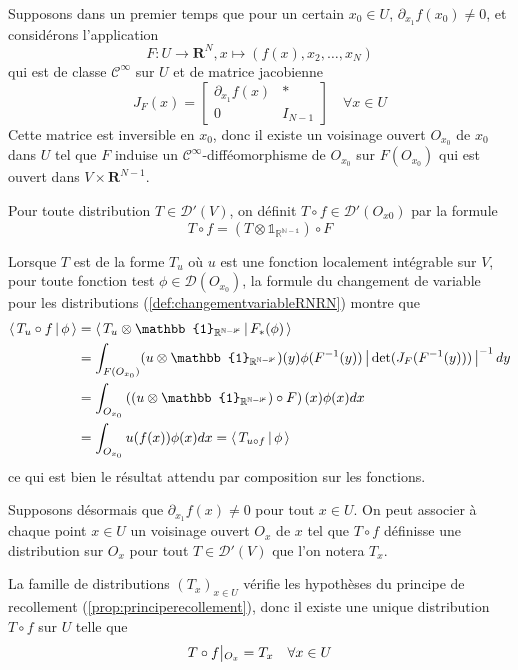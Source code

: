         Supposons dans un premier temps que pour un certain $x_0 \in U$, $\partial_{x_1}f(x_0) \neq 0$, et considérons l’application 
        \[ F : U \to \mathbf{R}^N, x \mapsto \left(f(x), x_2, \ldots, x_N\right) \]   
        qui est de classe $\mathcal{C}^{\infty}$ sur $U$ et de matrice jacobienne 
        \[ J_F(x) = \begin{bmatrix}
            \partial_{x_1} f(x) & * \\
            0 & I_{N-1}
        \end{bmatrix} \quad \forall x \in U \]
        Cette matrice est inversible en $x_0$, donc il existe un voisinage ouvert $O_{x_0}$ de $x_0$ dans $U$ tel que $F$ induise un $\mathcal{C}^{\infty}$-difféomorphisme de $O_{x_0}$ sur $F(O_{x_0})$ qui est ouvert dans $V \times \mathbf{R}^{N-1}$. 

        Pour toute distribution $T \in \mathcal{D}'(V)$, on définit $T \circ f \in \mathcal{D}'(O_{x 0})$  par la formule 
        \[ T \circ f = \left(T \otimes \mathbb{1}_{\mathbb{R^{N-1}}}\right) \circ F \]  

        Lorsque $T$ est de la forme $T_u$ où $u$ est une fonction localement intégrable sur $V$, pour toute fonction test $\phi \in \mathcal{D}(O_{x_0})$, la formule du changement de variable pour les distributions (\ref{def:changementvariableRNRN}) montre que 
        \begin{align*}
            \spr{T_u \circ f}{\phi}
            &= \spr{T_u \otimes \mathbb{1}_{\mathbb{R^{N-1}}}}{F_* (\phi)} \\
            &= \int_{F(O_{x_0})} (u \otimes \mathbb{1}_{\mathbb{R^{N-1}}})(y) \phi(F^{-1}(y)) \abs{\det(J_F(F^{-1}(y)))}^{-1} dy \\
            &= \int_{O_{x_0}} \left((u \otimes \mathbb{1}_{\mathbb{R^{N-1}}}) \circ F \right)(x)\phi(x) dx \\
            &= \int_{O_{x_0}} u(f(x)) \phi(x) dx = \spr{T_{u \circ f}}{\phi}
        \end{align*}
        ce qui est bien le résultat attendu par composition sur les fonctions.

        Supposons désormais que $\partial_{x_1} f(x) \neq 0$ pour tout $x \in U$. On peut associer à chaque point $x \in U$ un voisinage ouvert $O_{x}$ de $x$ tel que $T \circ f$ définisse une distribution sur $O_x$ pour tout $T \in \mathcal{D}'(V)$ que l’on notera $T_x$.

        La famille de distributions $(T_x)_{x \in U}$ vérifie les hypothèses du principe de recollement (\ref{prop:principerecollement}), donc il existe une unique distribution $T \circ f$ sur $U$ telle que 
        \[ T \circ f \big|\vphantom{|}_{O_x} = T_x \quad \forall x \in U \]

